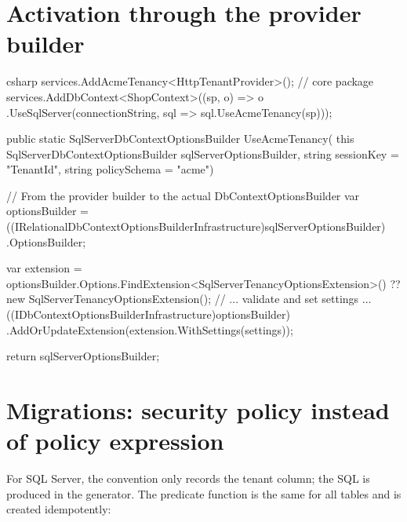 \section{Activation through the provider builder}

\begin{sourcecode}{csharp}
services.AddAcmeTenancy<HttpTenantProvider>();                    // core package
services.AddDbContext<ShopContext>((sp, o) => o
    .UseSqlServer(connectionString, sql => sql.UseAcmeTenancy(sp)));

public static SqlServerDbContextOptionsBuilder UseAcmeTenancy(
    this SqlServerDbContextOptionsBuilder sqlServerOptionsBuilder,
    string sessionKey = "TenantId",
    string policySchema = "acme")
{
    // From the provider builder to the actual DbContextOptionsBuilder
    var optionsBuilder =
        ((IRelationalDbContextOptionsBuilderInfrastructure)sqlServerOptionsBuilder)
        .OptionsBuilder;

    var extension = optionsBuilder.Options.FindExtension<SqlServerTenancyOptionsExtension>()
                    ?? new SqlServerTenancyOptionsExtension();
    // ... validate and set settings ...
    ((IDbContextOptionsBuilderInfrastructure)optionsBuilder)
        .AddOrUpdateExtension(extension.WithSettings(settings));

    return sqlServerOptionsBuilder;
}
\end{sourcecode}

\section{Migrations: security policy instead of policy expression}

For SQL Server, the convention only records the tenant column; the SQL is produced in the
generator. The predicate function is the same for all tables and is created idempotently:

